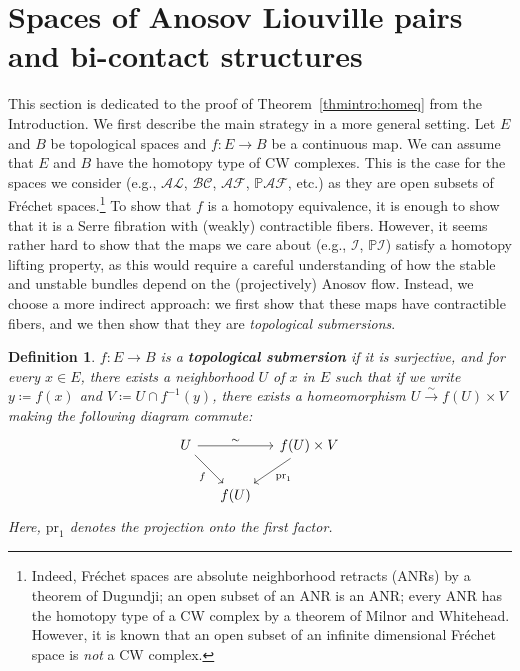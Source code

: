 \documentclass[letterpaper, 11pt]{article}
\numberwithin{equation}{section}
\newtheorem{defn}[thm]{Definition}
\begin{document}
		\section{Spaces of Anosov Liouville pairs and bi-contact structures} \label{sec:spaces}

This section is dedicated to the proof of Theorem~\ref{thmintro:homeq} from the Introduction. We first describe the main strategy in a more general setting. Let $E$ and $B$ be topological spaces and $f : E \rightarrow B$ be a continuous map. We can assume that $E$ and $B$ have the homotopy type of CW complexes. This is the case for the spaces we consider (e.g., $\mathcal{AL}$, $\mathcal{BC}$, $\mathcal{AF}$, $\mathbb{P}\mathcal{AF}$, etc.) as they are open subsets of Fr\'echet spaces.\footnote{Indeed, Fr\'{e}chet spaces are absolute neighborhood retracts (ANRs) by a theorem of Dugundji; an open subset of an ANR is an ANR; every ANR has the homotopy type of a CW complex by a theorem of Milnor and Whitehead. However, it is known that an open subset of an infinite dimensional Fr\'{e}chet space is \emph{not} a CW complex.} To show that $f$ is a homotopy equivalence, it is enough to show that it is a Serre fibration with (weakly) contractible fibers. However, it seems rather hard to show that the maps we care about (e.g., $\mathcal{I}$, $\mathbb{P}\mathcal{I}$) satisfy a homotopy lifting property, as this would require a careful understanding of how the stable and unstable bundles depend on the (projectively) Anosov flow. Instead, we choose a more indirect approach: we first show that these maps have contractible fibers, and we then show that they are \emph{topological submersions}.

\begin{defn}
    $f : E \rightarrow B$ is a \textbf{topological submersion} if it is surjective, and for every $x\in E$, there exists a neighborhood $U$ of $x$ in $E$ such that if we write $y \coloneqq f(x)$ and $V\coloneqq U \cap f^{-1}(y)$, there exists a homeomorphism $U \overset{\sim}{\longrightarrow} f(U) \times V$ making the following diagram commute:
    $$ \begin{tikzcd}[column sep=small]
    U \arrow[rr, "\sim"] \arrow[dr, "f"']
	&                         & f(U) \times V \arrow[dl, "\mathrm{pr}_1"] \\
& f(U)   & 
\end{tikzcd}$$
Here, $\mathrm{pr}_1$ denotes the projection onto the first factor.
\end{defn}
\end{document}
